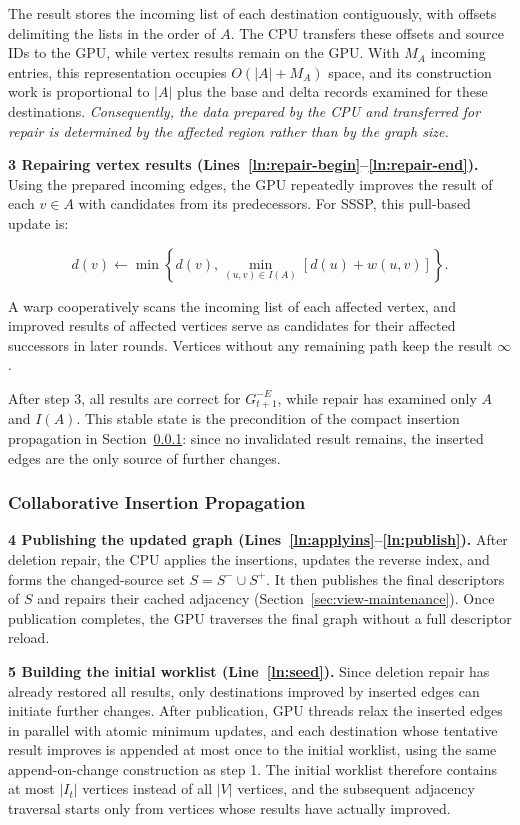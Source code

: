 The result stores the incoming list of each destination contiguously, with offsets delimiting the lists in the order of $A$. The CPU transfers these offsets and source IDs to the GPU, while vertex results remain on the GPU. With $M_A$ incoming entries, this representation occupies $O(|A|+M_A)$ space, and its construction work is proportional to $|A|$ plus the base and delta records examined for these destinations. \textit{Consequently, the data prepared by the CPU and transferred for repair is determined by the affected region rather than by the graph size.}

\textbf{3 Repairing vertex results (Lines~\ref{ln:repair-begin}--\ref{ln:repair-end}).} Using the prepared incoming edges, the GPU repeatedly improves the result of each $v\in A$ with candidates from its predecessors. For SSSP, this pull-based update is:

\begin{equation}
d(v)\leftarrow\min\left\{d(v),
\min_{(u,v)\in I(A)}[d(u)+w(u,v)]\right\}.
\label{eq:pull}
\end{equation}

A warp cooperatively scans the incoming list of each affected vertex, and improved results of affected vertices serve as candidates for their affected successors in later rounds. Vertices without any remaining path keep the result $\infty$.

After step 3, all results are correct for $G_{t+1}^{-E}$, while repair has examined only $A$ and $I(A)$. This stable state is the precondition of the compact insertion propagation in Section~\ref{sec:insertion-propagation}: since no invalidated result remains, the inserted edges are the only source of further changes.

\subsubsection{Collaborative Insertion Propagation}
\label{sec:insertion-propagation}

\textbf{4 Publishing the updated graph (Lines~\ref{ln:applyins}--\ref{ln:publish}).} After deletion repair, the CPU applies the insertions, updates the reverse index, and forms the changed-source set $S=S^-\cup S^+$. It then publishes the final descriptors of $S$ and repairs their cached adjacency (Section~\ref{sec:view-maintenance}). Once publication completes, the GPU traverses the final graph without a full descriptor reload.

\textbf{5 Building the initial worklist (Line~\ref{ln:seed}).} Since deletion repair has already restored all results, only destinations improved by inserted edges can initiate further changes. After publication, GPU threads relax the inserted edges in parallel with atomic minimum updates, and each destination whose tentative result improves is appended at most once to the initial worklist, using the same append-on-change construction as step 1. The initial worklist therefore contains at most $|I_t|$ vertices instead of all $|V|$ vertices, and the subsequent adjacency traversal starts only from vertices whose results have actually improved.

